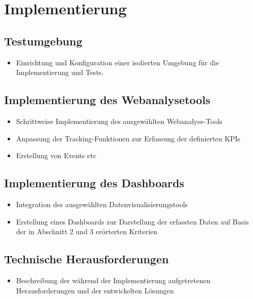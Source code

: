 \chapter{Implementierung}
\label{ch:implementierung}

\section{Testumgebung}
\begin{itemize}
    \item Einrichtung und Konfiguration einer isolierten Umgebung für die Implementierung und Tests.
\end{itemize}

\section{Implementierung des Webanalysetools}
\begin{itemize}
    \item Schrittweise Implementierung des ausgewählten Webanalyse-Tools
    \item Anpassung der Tracking-Funktionen zur Erfassung der definierten KPIs
    \item Erstellung von Events etc
\end{itemize}

\section{Implementierung des Dashboards}
\begin{itemize}
    \item Integration des ausgewählten Datenvisualisierungstools
    \item Erstellung eines Dashboards zur Darstellung der erfassten Daten auf Basis der in Abschnitt 2 und 3 erörterten Kriterien
\end{itemize}

\section{Technische Herausforderungen}
\begin{itemize}
    \item Beschreibung der während der Implementierung aufgetretenen Herausforderungen und der entwickelten Lösungen
\end{itemize}